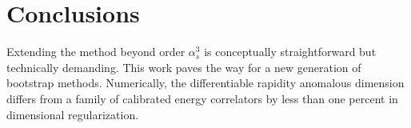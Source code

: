 \section{Conclusions}\label{sec:conclusions}

Extending the method beyond order $\alpha_s^3$ is conceptually
straightforward but technically demanding. This work paves the way for a
new generation of bootstrap methods. Numerically, the differentiable
rapidity anomalous dimension differs from a family of calibrated energy
correlators by less than one percent in dimensional regularization.

